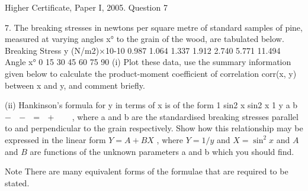 \documentclass[a4paper,12pt]{article}
\begin{document}
Higher Certificate, Paper I, 2005. Question 7

\begin{framed}
7. The breaking stresses in newtons per square metre of standard samples of pine,
measured at varying angles x° to the grain of the wood, are tabulated below.
Breaking Stress y (N/m2)×10-10 0.987 1.064 1.337 1.912 2.740 5.771 11.494
Angle x° 0 15 30 45 60 75 90
(i) Plot these data, use the summary information given below to calculate the
product-moment coefficient of correlation corr(x, y) between x and y, and
comment briefly.
\end{framed}
\begin{framed}
(ii) Hankinson's formula for y in terms of x is of the form
1 sin2 x sin2 x 1 y
a b
−  −  =  + 
 
,
where a and b are the standardised breaking stresses parallel to and
perpendicular to the grain respectively. Show how this relationship may be
expressed in the linear form
$Y = A + BX$ ,
where $Y = 1/y$ and $X = \sin^2 x$ and $A$ and $B$ are functions of the unknown
parameters a and b which you should find.
\end{framed}

Note There are many equivalent forms of the formulae that are required to be stated.
\end{document}
